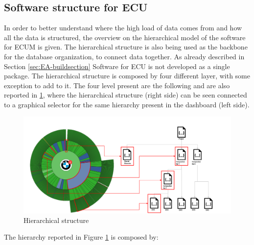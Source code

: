 \documentclass[../main.tex]{subfiles}
\begin{document}
\subsection{Software structure for ECU}
In order to better understand where the high load of data comes from and how all the data is structured, the overview on the hierarchical model of the software for \gls{ECUM} is given. The hierarchical structure is also being used as the backbone for the database organization, to connect data together.
As already described in Section \ref{sec:EA-buildsection} Software for \gls{ECU} is not developed as a single package. The hierarchical structure is composed by four different layer, with some exception to add to it. The four level present are the following and are also reported in \ref{fig:bcidashboard}, where the hierarchical structure (right side) can be seen connected to a graphical selector for the same hierarchy present in the dashboard (left side).
\begin{figure}[h]
    \centering
    \includegraphics[width=\linewidth]{images_folder/bci_structure.png}
    \caption{Hierarchical structure}
    \label{fig:bcidashboard}
\end{figure}
The hierarchy reported in Figure \ref{fig:bcidashboard} is composed by:
\end{document}
